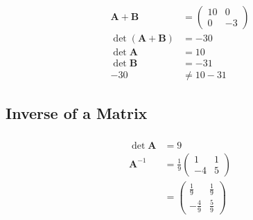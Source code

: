 \documentclass{article}
\begin{document}
\setcounter{subsubsection}{40}
\subsubsection{}

\begin{align*}
  \mathbf{A} + \mathbf{B}        & = \begin{pmatrix}
                                       10 & 0  \\
                                       0  & -3
                                     \end{pmatrix} \\
  \det (\mathbf{A} + \mathbf{B}) & = -30            \\
  \det \mathbf{A}                & = 10             \\
  \det \mathbf{B}                & = -31            \\
  -30                            & \ne 10 - 31
\end{align*}

\subsection{Inverse of a Matrix}

\setcounter{subsubsection}{2}
\subsubsection{}

\begin{align*}
  \det \mathbf{A} & = 9                          \\
  \mathbf{A}^{-1} & = \frac{1}{9} \begin{pmatrix}
                                    1  & 1 \\
                                    -4 & 5
                                  \end{pmatrix} \\
                  & = \begin{pmatrix}
                        \frac{1}{9}  & \frac{1}{9} \\
                        -\frac{4}{9} & \frac{5}{9}
                      \end{pmatrix}
\end{align*}

\setcounter{subsubsection}{4}
\subsubsection{}
\end{document}
